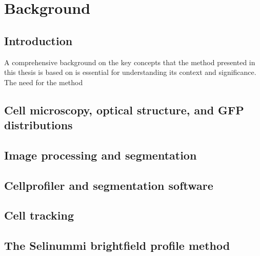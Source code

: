
\chapter{Background}

\ifpdf
    \graphicspath{{Chapter3/Figs/Raster/}{Chapter3/Figs/PDF/}{Chapter3/Figs/}}
\else
    \graphicspath{{Chapter3/Figs/Vector/}{Chapter3/Figs/}}
\fi

\section{Introduction}

A comprehensive background on the key concepts that the method presented in this thesis is based on is essential for understanding its context and significance. The need for the method

\section{Cell microscopy, optical structure, and GFP distributions}
\section{Image processing and segmentation}
\section{Cellprofiler and segmentation software}
\section{Cell tracking}
\section{The Selinummi brightfield profile method}
